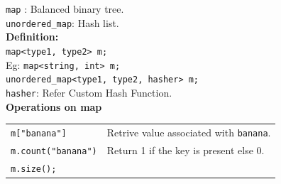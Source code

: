 \texttt{map} : Balanced binary tree.\\
\texttt{unordered\_map}: Hash list.\\

\textbf{Definition:}\\
\texttt{map<type1, type2> m;}\\
Eg: \texttt{map<string, int> m;}\\
\texttt{unordered\_map<type1, type2, hasher> m;}\\
\texttt{hasher}: Refer Custom Hash Function.\\

\textbf{Operations on map}\\
\begin{tabularx}{\linewidth}{lX}
\texttt{m["banana"]} & Retrive value associated with \texttt{banana}.\\
\texttt{m.count("banana")} & Return 1 if the key is present else 0.\\
\texttt{m.size();} & \\
\end{tabularx}
